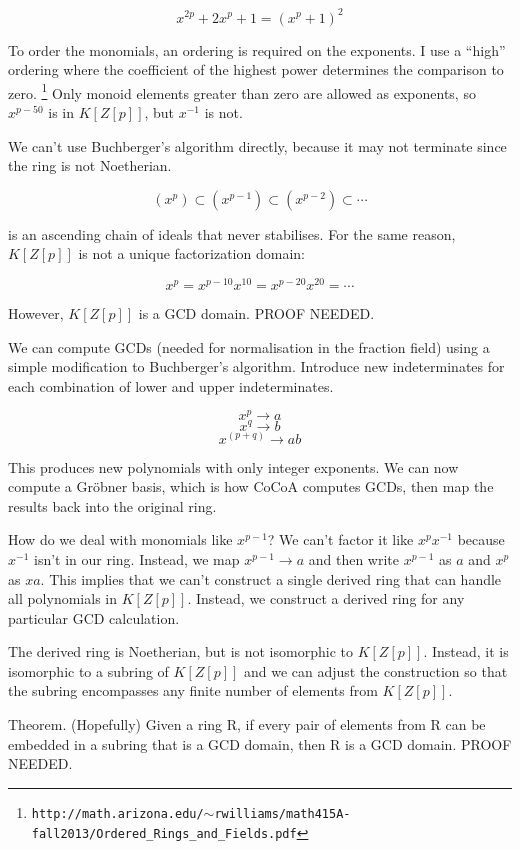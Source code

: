 \documentclass{article}
\begin{document}
$$x^{2p}+2x^p+1=(x^p+1)^2$$

To order the monomials, an ordering is required on the exponents.  I use a ``high''
ordering where the coefficient of the highest power determines the comparison to zero.
\footnote{\tt http://math.arizona.edu/$\sim$rwilliams/math415A-fall2013/Ordered\_Rings\_and\_Fields.pdf}
Only monoid elements greater than zero are allowed as exponents, so $x^{p-50}$ is
in $K[Z[p]]$, but $x^{-1}$ is not.

We can't use Buchberger's algorithm directly, because it may not terminate since
the ring is not Noetherian.

$$(x^p) \subset (x^{p-1}) \subset (x^{p-2}) \subset \cdots$$

is an ascending chain of ideals that never stabilises.
For the same reason, $K[Z[p]]$ is not a unique factorization domain:

$$x^p = x^{p-10}x^{10} = x^{p-20}x^{20} = \cdots$$

However, $K[Z[p]]$ is a GCD domain.  PROOF NEEDED.

We can compute GCDs (needed for normalisation in the fraction field) using a
simple modification to Buchberger's algorithm.  Introduce new indeterminates
for each combination of lower and upper indeterminates.

$$x^p  \to  a$$
$$x^q  \to  b$$
$$x^{(p+q)} \to ab$$

This produces new polynomials with only integer exponents.  We can now
compute a Gr\"obner basis, which is how CoCoA computes GCDs, then map
the results back into the original ring.

How do we deal with monomials like $x^{p-1}$?  We can't factor it like
$x^px^{-1}$ because $x^{-1}$ isn't in our ring.  Instead, we map
$x^{p-1} \to a$ and then write $x^{p-1}$ as $a$ and $x^p$ as $xa$.
This implies that we can't construct a single derived ring that can
handle all polynomials in $K[Z[p]]$.  Instead, we construct a
derived ring for any particular GCD calculation.

The derived ring is Noetherian, but is not isomorphic to $K[Z[p]]$.
Instead, it is isomorphic to a subring of $K[Z[p]]$ and we can adjust
the construction so that the subring encompasses any finite number of
elements from $K[Z[p]]$.

Theorem.  (Hopefully) Given a ring R, if every pair of elements from R can be
embedded in a subring that is a GCD domain, then R is a GCD domain.
PROOF NEEDED.

\vfill\eject
\end{document}
